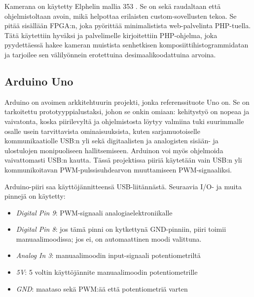 \documentclass[finnish,12pt]{article}
\begin{document}
Kamerana on käytetty Elphelin mallia 353 \cite{Elphel}. Se on sekä raudaltaan että ohjelmistoltaan avoin, mikä helpottaa erilaisten custom-sovellusten tekoa. Se pitää sisällään FPGA:n, joka pyörittää minimalistista web-palvelinta PHP-tuella. Tätä käytettiin hyväksi ja palvelimelle kirjoitettiin PHP-ohjelma, joka pyydettäessä hakee kameran muistista senhetkisen komposiittihistogrammidatan ja tarjoilee sen välilyönnein erotettuina desimaalikoodattuina arvoina. 

\subsection{Arduino Uno}

Arduino \cite{Arduino} on avoimen arkkitehtuurin projekti, jonka referenssituote Uno on. Se on tarkoitettu prototyyppialustaksi, johon se onkin omiaan: kehitystyö on nopeaa ja vaivatonta, koska piirilevyltä ja ohjelmistosta löytyy valmiina tuki suurimmalle osalle usein tarvittavista ominaisuuksista, kuten sarjamuotoiselle kommunikaatiolle USB:n yli sekä digitaalisten ja analogisten sisään- ja ulostulojen monipuoliseen hallitsemiseen. Arduinon voi myös ohjelmoida vaivattomasti USB:n kautta. Tässä projektissa piiriä käytetään vain USB:n yli kommunikoitavan PWM-pulssisuhdearvon muuttamiseen PWM-signaaliksi.

Arduino-piiri saa käyttöjännitteensä USB-liitännästä. Seuraavia I/O- ja muita pinnejä on käytetty:

\begin{itemize}
 \item \textit{Digital Pin 9}: PWM-signaali analogiaelektroniikalle
 \item \textit{Digital Pin 8}: jos tämä pinni on kytkettynä GND-pinniin, piiri toimii manuaalimoodissa; jos ei, on automaattinen moodi valittuna.
 \item \textit{Analog In 3}: manuaalimoodin input-signaali potentiometriltä
 \item \textit{5V}: 5 voltin käyttöjännite manuaalimoodin potentiometrille
 \item \textit{GND}: maataso sekä PWM:ää että potentiometriä varten
\end{itemize}
\end{document}
